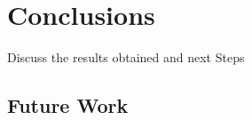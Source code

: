 
\chapter{Conclusions}


\label{Section7}

Discuss the results obtained and next Steps

\section{Future Work}